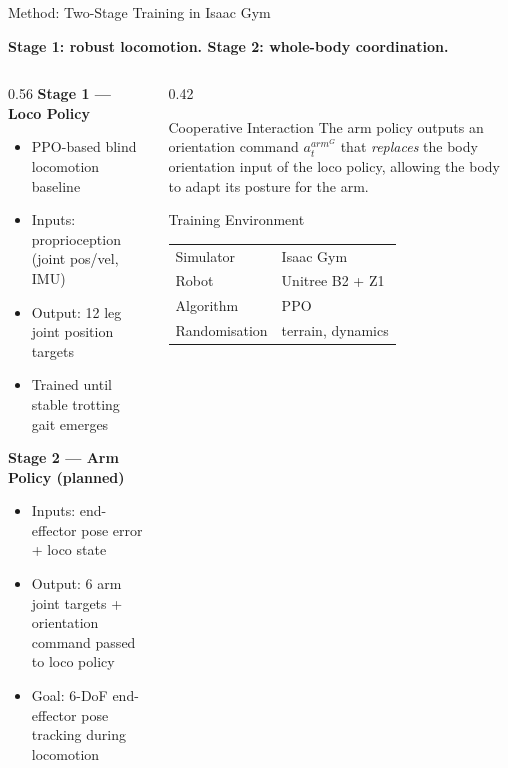 \documentclass{beamer}
\newcommand{\takeaway}[1]{\begin{center}\large\bfseries #1\end{center}\vspace{-0.3em}}
\newcommand{\smallgap}{\vspace{0.5em}}
\begin{document}
\begin{frame}{Method: Two-Stage Training in Isaac Gym}
\takeaway{Stage 1: robust locomotion. Stage 2: whole-body coordination.}

\begin{columns}
\begin{column}{0.56\textwidth}
\textbf{Stage 1 — Loco Policy}
\begin{itemize}
  \item PPO-based blind locomotion baseline
  \item Inputs: proprioception (joint pos/vel, IMU)
  \item Output: 12 leg joint position targets
  \item Trained until stable trotting gait emerges
\end{itemize}

\smallgap
\textbf{Stage 2 — Arm Policy (planned)}
\begin{itemize}
  \item Inputs: end-effector pose error + loco state
  \item Output: 6 arm joint targets +
        orientation command passed to loco policy
  \item Goal: 6-DoF end-effector pose tracking
        during locomotion
\end{itemize}
\end{column}

\begin{column}{0.42\textwidth}
\begin{block}{Cooperative Interaction}
\small
The arm policy outputs an orientation command
$a_t^{arm^G}$ that \emph{replaces} the body
orientation input of the loco policy, allowing
the body to adapt its posture for the arm.
\end{block}

\smallgap
\begin{block}{Training Environment}
\small
\begin{tabular}{@{}ll@{}}
Simulator  & Isaac Gym \\
Robot      & Unitree B2 + Z1 \\
Algorithm  & PPO \\
Randomisation & terrain, dynamics \\
\end{tabular}
\end{block}
\end{column}
\end{columns}
\end{frame}
\end{document}
